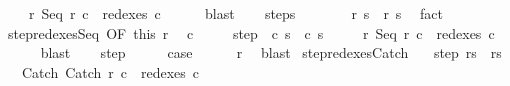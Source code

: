 \begin{isabellebody}
\ \ \ \ r{\isacharprime}{\isacharcolon}\ {\isachardoublequoteopen}Seq\ r{\isacharprime}\ c\ {\isasymin}\ redexes\ c{\isacharprime}{\isachardoublequoteclose}\isanewline
\ \ \ \ \isamarkupfalse%
\ blast\isanewline
\ \ \isamarkupfalse%
\ steps\isanewline
\ \ \isamarkupfalse%
\isanewline
\ \ \isamarkupfalse%
\ {\isachardoublequoteopen}{\isasymGamma}{\isasymturnstile}\ {\isacharparenleft}r{\isacharprime}{\isacharcomma}\ s{\isacharprime}{\isacharparenright}\ {\isasymrightarrow}\ {\isacharparenleft}r{\isacharprime}{\isacharprime}{\isacharcomma}\ s{\isacharprime}{\isacharprime}{\isacharparenright}{\isachardoublequoteclose}\ \isamarkupfalse%
\ fact\isanewline
\ \ \isamarkupfalse%
\ step{\isacharunderscore}redexes{\isacharunderscore}Seq\ {\isacharbrackleft}OF\ this\ r{\isacharprime}{\isacharbrackright}\ \isamarkupfalse%
\ c{\isacharprime}{\isacharprime}\ \isanewline
\ \ \ \ step{\isacharcolon}\ {\isachardoublequoteopen}{\isasymGamma}{\isasymturnstile}\ {\isacharparenleft}c{\isacharprime}{\isacharcomma}\ s{\isacharprime}{\isacharparenright}\ {\isasymrightarrow}\ {\isacharparenleft}c{\isacharprime}{\isacharprime}{\isacharcomma}\ s{\isacharprime}{\isacharprime}{\isacharparenright}{\isachardoublequoteclose}\ \isanewline
\ \ \ \ r{\isacharprime}{\isacharprime}{\isacharcolon}\ {\isachardoublequoteopen}Seq\ r{\isacharprime}{\isacharprime}\ c\ {\isasymin}\ redexes\ c{\isacharprime}{\isacharprime}{\isachardoublequoteclose}\isanewline
\ \ \ \ \isamarkupfalse%
\ blast\isanewline
\ \ \isamarkupfalse%
\ step\isanewline
\ \ \isamarkupfalse%
\ \isamarkupfalse%
\ {\isacharquery}case\isanewline
\ \ \ \ \isamarkupfalse%
\ r{\isacharprime}{\isacharprime}\ \isamarkupfalse%
\ blast\isanewline
{}\isamarkupfalse%
%
\endisatagproof
{\isafoldproof}%
%
\isadelimproof
\isanewline
%
\endisadelimproof
\isanewline
{}\isamarkupfalse%
\ step{\isacharunderscore}redexes{\isacharunderscore}Catch{\isacharcolon}\isanewline
\ \ \ step{\isacharcolon}\ {\isachardoublequoteopen}{\isasymGamma}{\isasymturnstile}{\isacharparenleft}r{\isacharcomma}s{\isacharparenright}\ {\isasymrightarrow}\ {\isacharparenleft}r{\isacharprime}{\isacharcomma}s{\isacharprime}{\isacharparenright}{\isachardoublequoteclose}\isanewline
\ \ \ Catch{\isacharcolon}\ {\isachardoublequoteopen}Catch\ r\ c\ {\isasymin}\ redexes\ c{\isachardoublequoteclose}\isanewline

\end{isabellebody}
